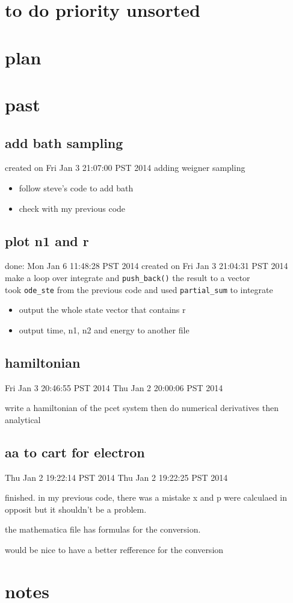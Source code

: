 \documentclass{article}
\let\Item\item
\renewcommand\item{\normalcolor\Item}
\newcommand\done{\color[RGB]{129, 180, 185} \ding{52} }
\begin{document}
\section{to do priority unsorted}
\section{plan}
\section{past}
\subsection{add bath sampling}
created on Fri Jan  3 21:07:00 PST 2014
\label{sub:add_bath}
adding weigner sampling
\begin{itemize}
  \item \done follow steve's code to add bath
  \item \done check with my previous code
\end{itemize}
\subsection{plot n1 and r}
done: Mon Jan  6 11:48:28 PST 2014
created on Fri Jan  3 21:04:31 PST 2014
\label{sub:plot_n1_and_r}
make a loop over integrate and \verb`push_back()` the result to a vector\\
took \verb`ode_ste` from the previous code and used \verb`partial_sum` to integrate\\
\begin{itemize}
  \item \done output the whole state vector that contains r
  \item \done output time, n1, n2 and energy to another file
\end{itemize}
\subsection{hamiltonian}
Fri Jan  3 20:46:55 PST 2014
Thu Jan  2 20:00:06 PST 2014
\label{sub:hamiltonian}

write a hamiltonian of the pcet system then do numerical derivatives then analytical

\subsection{aa to cart for electron}
Thu Jan  2 19:22:14 PST 2014
Thu Jan  2 19:22:25 PST 2014
\label{sub:aa_to_cart_for_electron}

finished. in my previous code, there was a mistake x and p were calculaed in opposit but it shouldn't be a problem.

the mathematica file has formulas for the conversion. 

would be nice to have a better refference for the conversion

\section{notes}
\end{document}

